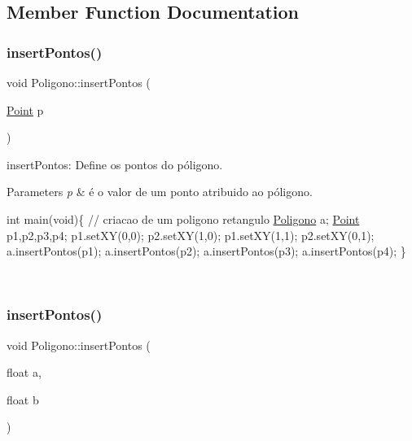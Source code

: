 \subsection{Member Function Documentation}
\mbox{\label{class_poligono_a9bd6496f563d349046c74e3b0f03ef19}} 
\subsubsection{\texorpdfstring{insert\+Pontos()}{insertPontos()}\hspace{0.1cm}{\footnotesize\ttfamily [1/2]}}
{\footnotesize\ttfamily void Poligono\+::insert\+Pontos (\begin{DoxyParamCaption}\item[{\mbox{\hyperlink{class_point}{Point}}}]{p }\end{DoxyParamCaption})}



insert\+Pontos\+: Define os pontos do póligono. 


\begin{DoxyParams}{Parameters}
{\em p} & é o valor de um ponto atribuido ao póligono. 
\begin{DoxyPre}
int main(void)\{
// criacao de um poligono retangulo
   \mbox{\hyperlink{class_poligono}{Poligono}} a;
   \mbox{\hyperlink{class_point}{Point}} p1,p2,p3,p4;
   p1.setXY(0,0);
   p2.setXY(1,0);
   p1.setXY(1,1);
   p2.setXY(0,1);
   a.insertPontos(p1);
   a.insertPontos(p2);
   a.insertPontos(p3);
   a.insertPontos(p4);
\}
\end{DoxyPre}
 \\
\hline
\end{DoxyParams}
\mbox{\label{class_poligono_a7db9753df6a913b910f3d293f6324267}} 
\subsubsection{\texorpdfstring{insert\+Pontos()}{insertPontos()}\hspace{0.1cm}{\footnotesize\ttfamily [2/2]}}
{\footnotesize\ttfamily void Poligono\+::insert\+Pontos (\begin{DoxyParamCaption}\item[{float}]{a,  }\item[{float}]{b }\end{DoxyParamCaption})}



